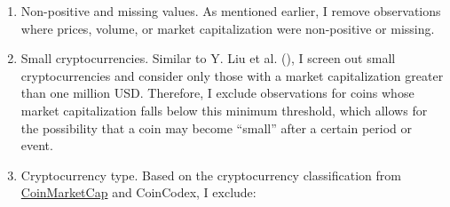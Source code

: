 \documentclass[
  12pt,
  a4paper,
  openany]{scrbook}
\begin{document}
\begin{enumerate}
\def\labelenumi{\arabic{enumi}.}
\item
  Non-positive and missing values. As mentioned earlier, I remove
  observations where prices, volume, or market capitalization were
  non-positive or missing.
\item
  Small cryptocurrencies. Similar to Y. Liu et al.
  (), I screen out small
  cryptocurrencies and consider only those with a market capitalization
  greater than one million USD. Therefore, I exclude observations for
  coins whose market capitalization falls below this minimum threshold,
  which allows for the possibility that a coin may become ``small''
  after a certain period or event.
\item
  Cryptocurrency type. Based on the cryptocurrency classification from
  \href{https://coinmarketcap.com/cryptocurrency-category/}{CoinMarketCap}
  and CoinCodex, I exclude:


\end{enumerate}
\end{document}

